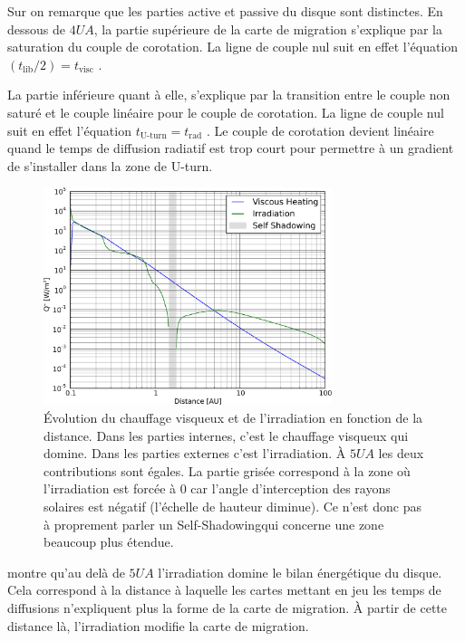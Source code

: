 Sur  on remarque que les parties active et passive du disque sont distinctes. En dessous de $4\unit{UA}$, la partie supérieure de la carte de migration s'explique par la saturation du couple de corotation. La ligne de couple nul suit en effet l'équation $(t_\text{lib}/2) = t_\text{visc}$ .

La partie inférieure quant à elle, s'explique par la transition entre le couple non saturé et le couple linéaire pour le couple de corotation. La ligne de couple nul suit en effet l'équation $t_\text{U-turn} = t_\text{rad}$ . Le couple de corotation devient linéaire quand le temps de diffusion radiatif est trop court pour permettre à un gradient de s'installer dans la zone de \og U-turn\fg.

\begin{figure}[htb]
\centering
\includegraphics[width=0.75\textwidth]{figure/migration_map/viscous_vs_irradiation.pdf}

\caption{Évolution du chauffage visqueux et de l'irradiation en fonction de la distance. Dans les parties internes, c'est le
chauffage visqueux qui domine. Dans les parties externes c'est l'irradiation. À $5\unit{UA}$ les deux contributions sont
égales. La partie grisée correspond à la zone où l'irradiation est forcée à 0 car l'angle d'interception des rayons solaires est négatif (l'échelle de hauteur diminue). Ce n'est donc pas à proprement parler un \og Self-Shadowing\fg qui concerne une zone beaucoup plus étendue.}\label{fig:viscous_vs_irradiation}
\end{figure}

 montre qu'au delà de $5\unit{UA}$ l'irradiation domine le bilan énergétique du disque. Cela
correspond à la distance à laquelle les cartes mettant en jeu les temps de diffusions n'expliquent plus la forme de la carte de
migration. À partir de cette distance là, l'irradiation modifie la carte de migration. 

